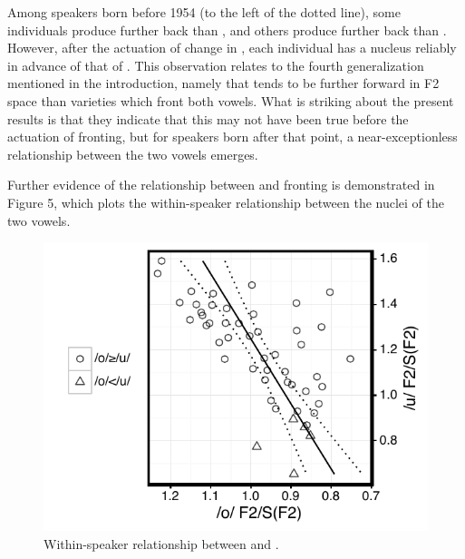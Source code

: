 \documentclass[12pt]{article}
\begin{document}
Among speakers born before 1954 (to the left of the dotted line), some individuals produce  further back than , and others produce  further back than . However, after the actuation of change in , each individual has a  nucleus reliably in advance of that of . This observation relates to the fourth generalization mentioned in the introduction, namely that  tends to be further forward in F2 space than  varieties which front both vowels. What is striking about the present results is that they indicate that this may not have been true before the actuation of  fronting, but for speakers born after that point, a near-exceptionless relationship between the two vowels emerges.

Further evidence of the relationship between  and  fronting is demonstrated in Figure 5, which plots the within-speaker relationship between the nuclei of the two vowels.

\vspace*{6pt}
\begin{figure}[H]
\centering
\includegraphics{owuwcorrelation.pdf}
\caption{Within-speaker relationship between  and .}
\end{figure}
\vspace*{6pt}
\end{document}
